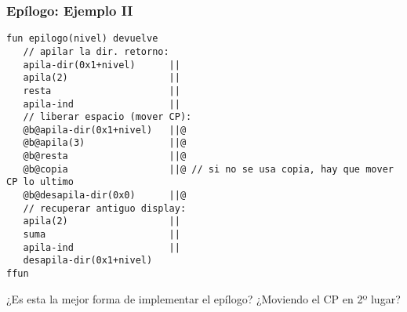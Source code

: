 \documentclass[hyperref={pdfpagelabels=false},tree-dvips,compress]{beamer}
\begin{document}
\begin{frame}[fragile]

\end{frame}
\begin{frame}[fragile]
\frametitle{Epílogo: Ejemplo II}

\begin{lstlisting}[style=codigoMP,basicstyle=\tiny\ttfamily]
fun epilogo(nivel) devuelve
   // apilar la dir. retorno:
   apila-dir(0x1+nivel)      ||
   apila(2)                  ||
   resta                     ||
   apila-ind                 ||
   // liberar espacio (mover CP):
   @b@apila-dir(0x1+nivel)   ||@
   @b@apila(3)               ||@
   @b@resta                  ||@
   @b@copia                  ||@ // si no se usa copia, hay que mover CP lo ultimo
   @b@desapila-dir(0x0)      ||@
   // recuperar antiguo display:
   apila(2)                  ||
   suma                      ||
   apila-ind                 ||
   desapila-dir(0x1+nivel)
ffun
\end{lstlisting}

¿Es esta la mejor forma de implementar el epílogo? ¿Moviendo el CP en 2º lugar?

\end{frame}
\end{document}
